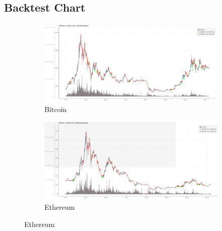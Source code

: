 \documentclass[letterpaper]{article}
\begin{document}
\subsection{Backtest Chart}
\label{sec:backtest_chart}
\begin{figure}[H]
    \centering
    \begin{subfigure}[b]{1\linewidth}
      \includegraphics[width=\linewidth]{images/backtest/BTC.png}
      \caption{Bitcoin}
      \label{fig:bitcoin}
    \end{subfigure}
    \begin{subfigure}[b]{1\linewidth}
      \includegraphics[width=\linewidth]{images/backtest/ETH.png}
      \caption{Ethereum}  
      \label{fig:ethereum}
    \end{subfigure}
    \newpage
\end{figure}
\end{document}
